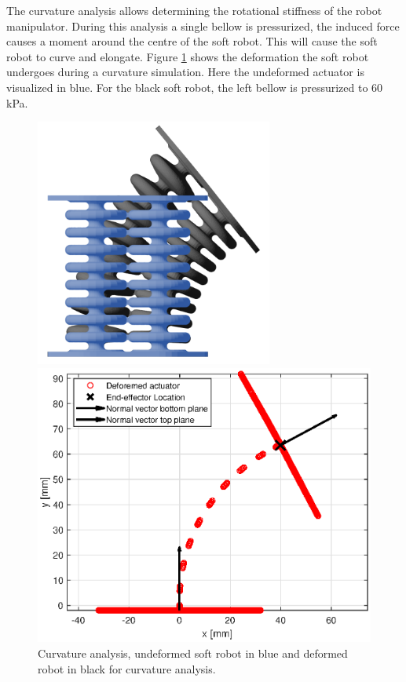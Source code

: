 The curvature analysis allows determining the rotational stiffness of the robot manipulator. During this analysis a single bellow is pressurized, the induced force causes a moment around the centre of the soft robot. This will cause the soft robot to curve and elongate. Figure \ref{fig3:schematiccurvature} shows the deformation the soft robot undergoes during a curvature simulation. Here the undeformed actuator is visualized in blue. For the black soft robot, the left bellow is pressurized to 60 kPa.



\begin{figure}[H]
    \centering
\begin{minipage}{0.5\textwidth}
        \centering
        \includegraphics[width=0.695\textwidth]{Figures/Chapter3/curvature.png} 
        \caption{Curvature analysis, undeformed soft robot in blue and deformed robot in black for curvature analysis. }
        \label{fig3:schematiccurvature}
    \end{minipage}\hfill
    \begin{minipage}{0.5\textwidth}
        \centering
        \includegraphics[width=\textwidth]{Figures/Chapter3/rotation60kpa.eps} 

\end{minipage}
\end{figure}
